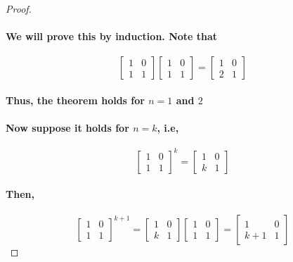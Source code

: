 \documentclass{report}
\begin{document}
\begin{proof}
{\paragraph{We will prove this by induction. Note that}

\begin{equation}
\begin{bmatrix}
1&0\\1&1
\end{bmatrix}
\begin{bmatrix}
1&0\\1&1
\end{bmatrix}=
\begin{bmatrix}
1&0\\2&1
\end{bmatrix}
\end{equation}

\paragraph{Thus, the theorem holds for $n=1$ and $2$}

\paragraph{Now suppose it holds for $n=k$, i.e,}

\begin{equation}
\begin{bmatrix}
1&0\\1&1
\end{bmatrix}^k
=
\begin{bmatrix}
1&0\\k&1
\end{bmatrix}
\end{equation}

\paragraph{Then,}

\begin{equation}
\begin{bmatrix}
1&0\\1&1
\end{bmatrix}^{k+1}
=
\begin{bmatrix}
1&0\\k&1
\end{bmatrix}
\begin{bmatrix}
1&0\\1&1
\end{bmatrix}
=
\begin{bmatrix}
1&0\\k+1&1
\end{bmatrix}
\end{equation}

}
\end{proof}
\end{document}
